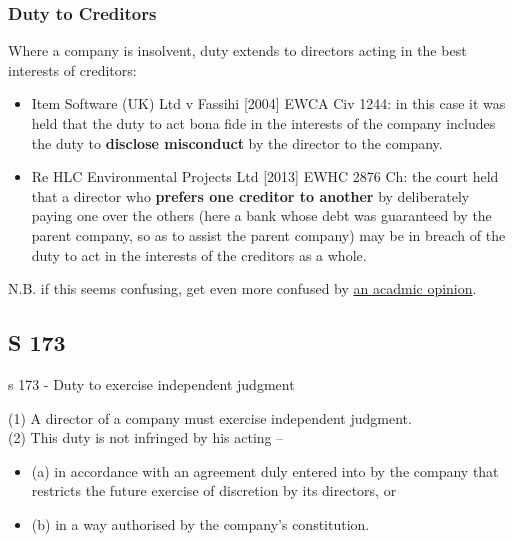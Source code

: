 \documentclass[
]{article}
\providecommand{\tightlist}{%
  \setlength{\itemsep}{0pt}\setlength{\parskip}{0pt}}
\newenvironment{env-136e818f-6bd8-45c9-b7d8-e6b8925f9e62}
{
    \savenotes\tcolorbox[blanker,breakable,left=5pt,borderline west={2pt}{-4pt}{green}]
}
{
    \endtcolorbox\spewnotes
}
\begin{document}
\hypertarget{duty-to-creditors}{%
\subsubsection{Duty to Creditors}\label{duty-to-creditors}}

Where a company is insolvent, duty extends to directors acting in the
best interests of creditors:

\begin{itemize}
\tightlist
\item
  Item Software (UK) Ltd v Fassihi {[}2004{]} EWCA Civ 1244: in this
  case it was held that the duty to act bona fide in the interests of
  the company includes the duty to \textbf{disclose misconduct} by the
  director to the company.
\item
  Re HLC Environmental Projects Ltd {[}2013{]} EWHC 2876 Ch: the court
  held that a director who \textbf{prefers one creditor to another} by
  deliberately paying one over the others (here a bank whose debt was
  guaranteed by the parent company, so as to assist the parent company)
  may be in breach of the duty to act in the interests of the creditors
  as a whole.
\end{itemize}

N.B. if this seems confusing, get even more confused by
\href{https://usir.salford.ac.uk/id/eprint/3112/1/CA_2006.pdf}{an
acadmic opinion}.

\hypertarget{s-173}{%
\subsection{S 173}\label{s-173}}

\begin{env-136e818f-6bd8-45c9-b7d8-e6b8925f9e62}

s 173 - Duty to exercise independent judgment

(1) A director of a company must exercise independent judgment.\\
(2) This duty is not infringed by his acting --

\begin{itemize}
\tightlist
\item
  (a) in accordance with an agreement duly entered into by the company
  that restricts the future exercise of discretion by its directors, or
\item
  (b) in a way authorised by the company's constitution.
\end{itemize}

\end{env-136e818f-6bd8-45c9-b7d8-e6b8925f9e62}
\end{document}
